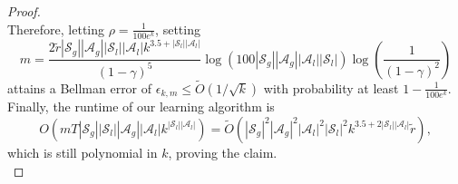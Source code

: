 \documentclass{article}
\theoremstyle{plain}
\theoremstyle{definition}
\begin{document}
\begin{proof}
\begin{equation}
    \end{equation}
Therefore, letting $\rho = \frac{1}{100 e^{k}}$, setting
\begin{equation}
    m = \frac{2\tilde{r}|\mathcal{S}_g||\mathcal{A}_g||\mathcal{S}_l||\mathcal{A}_l|k^{3.5+|\mathcal{S}_l||\mathcal{A}_l|}}{(1-\gamma)^5}\log\left({100|\mathcal{S}_g||\mathcal{A}_g||\mathcal{A}_l||\mathcal{S}_l|}{}\right)\log\left(\frac{1}{(1-\gamma)^2}\right)
\end{equation}
attains a Bellman error of $\epsilon_{k,m}\leq \tilde{O}(1/\sqrt{k})$ with probability at least $1 - \frac{1}{100e^k}$. Finally, the runtime of our learning algorithm is \[O(mT|\mathcal{S}_g||\mathcal{S}_l||\mathcal{A}_g||\mathcal{A}_l|k^{|\mathcal{S}_l||\mathcal{A}_l|}) = \tilde{O}(|\mathcal{S}_g|^2|\mathcal{A}_g|^2|\mathcal{A}_l|^2|\mathcal{S}_l|^2 k^{3.5 + 2|\mathcal{S}_l||\mathcal{A}_l|}\tilde{r}),\]
which is still polynomial in $k$, proving the claim.\qedhere \\
\end{proof}
\end{document}
